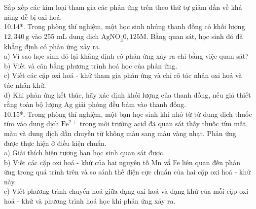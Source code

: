 \documentclass[10pt]{article}
\begin{document}
Sắp xếp các kim loại tham gia các phản ứng trên theo thứ tự giảm dần về khả năng dễ bị oxi hoá.\\
10.14*. Trong phòng thí nghiệm, một học sinh nhúng thanh đồng có khối lượng $12,340 \mathrm{~g}$ vào 255 mL dung dịch $\mathrm{AgNO}_{3} 0,125 \mathrm{M}$. Bằng quan sát, học sinh đó đã khẳng định có phản ứng xảy ra.\\
a) Vì sao học sinh đó lại khẳng định có phản ứng xảy ra chỉ bằng việc quan sát?\\
b) Viết và cân bằng phương trình hoá học của phản ứng.\\
c) Viết các cặp oxi hoá - khử tham gia phản ứng và chỉ rõ tác nhân oxi hoá và tác nhân khử.\\
d) Khi phản ứng kết thúc, hãy xác định khối lượng của thanh đồng, nếu giả thiết rằng toàn bộ lượng Ag giải phóng đều bám vào thanh đồng.\\
10.15*. Trong phòng thí nghiệm, một bạn học sinh khi nhỏ từ từ dung dịch thuốc tím vào dung dịch $\mathrm{Fe}^{2+}$ trong môi trường acid đã quan sát thấy thuốc tím mất màu và dung dịch dần chuyền từ không màu sang màu vàng nhạt. Phản ứng được thực hiện ở điều kiện chuẩn.\\
a) Giải thích hiện tượng bạn học sinh quan sát được.\\
b) Viết các cặp oxi hoá - khử của hai nguyên tố Mn vẩ Fe liên quan đến phản ứng trong quá trình trên và so sánh thế điện cực chuẩn của hai cặp oxi hoá - khử này.\\
c) Viết phương trình chuyển hoá giữa dạng oxi hoá và dạng khử của mỗi cặp oxi hoá - khử và phương trình hoá học khi phản ứng xảy ra.
\end{document}
